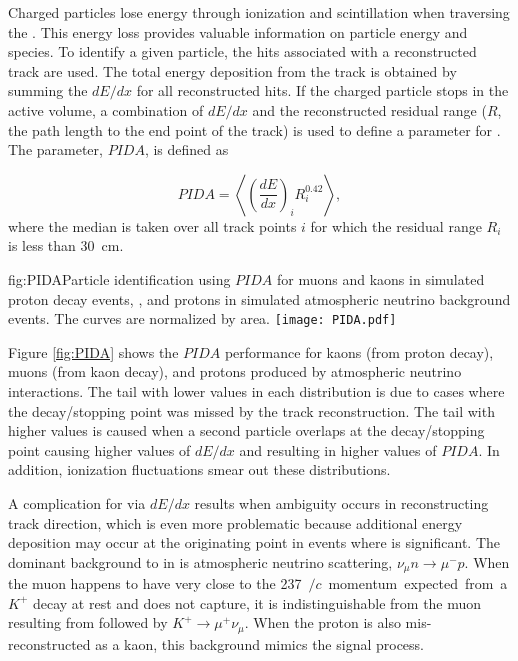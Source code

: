 Charged particles lose energy through ionization and scintillation when traversing the . This energy loss provides valuable information on particle energy and species. To identify a given particle, the hits associated with a reconstructed track are used.
The total energy deposition from the track is obtained by summing the $dE/dx$ for all reconstructed hits. 
If the charged particle stops in the  active volume, a combination of $dE/dx$ and the reconstructed residual range ($R$, the path length to the end point of the track) is used to define a parameter for .  The parameter, $PIDA$, %
is defined as~\cite{Acciarri:2013met}  

\begin{equation}
PIDA = \left\langle \left(\frac{dE}{dx}\right)_{i}R^{0.42}_{i}\right\rangle,\label{eqn:PIDA}
\end{equation}
where the median is taken over all track points $i$ for which the residual range $R_i$ is less than \SI{30}{\cm}.

\begin{dunefigure}{fig:PIDA}{Particle identification using $PIDA$ for muons and kaons in simulated proton decay events, \ptoknubar, and protons in simulated atmospheric neutrino background events.  The curves are normalized by area.}
\texttt{[image: PIDA.pdf]}
\end{dunefigure}

Figure \ref{fig:PIDA} shows the $PIDA$ performance for kaons (from proton decay), muons (from kaon decay), and protons produced by atmospheric neutrino interactions. The tail with lower values in each distribution is due to cases where the decay/stopping point was missed by the track reconstruction. The tail with higher values is caused when a second particle overlaps at the decay/stopping point causing higher values of $dE/dx$ and resulting in higher values of $PIDA$. In addition, ionization fluctuations smear out these distributions.

A complication for  via $dE/dx$ results when ambiguity occurs in reconstructing track direction, which is even more problematic because additional energy deposition may occur at the originating point in events where  is significant.  The dominant background to \ptoknubar in  is atmospheric neutrino  
scattering, $\nu_{\mu} n \rightarrow \mu^{-} p$.  When the muon happens to have very close
to the \SI{237}{\MeV$/c$} momentum expected from a $K^{+}$ decay at rest and does not capture, it is indistinguishable from the muon resulting from \ptoknubar followed by $K^{+} \rightarrow \mu^{+}\nu_{\mu}$. When
the proton is also mis-reconstructed as a kaon, this background mimics the signal process.  

